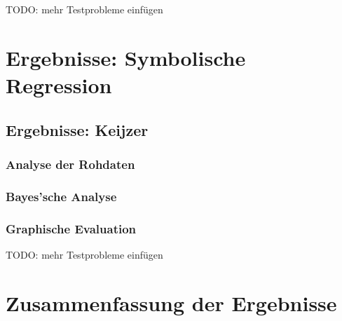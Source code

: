 TODO: mehr Testprobleme einfügen

\section{Ergebnisse: Symbolische Regression}
\label{sec:ergebnisseSR}

\subsection{Ergebnisse: Keijzer}
\label{subsec:ergebnisseKeijzer}
\subsubsection{Analyse der Rohdaten}
\label{keijzer:analyseRohdaten}
\subsubsection{Bayes'sche Analyse}
\label{keijzer:bayes}
\subsubsection{Graphische Evaluation}
\label{keijzer: graphische Evaluation}

TODO: mehr Testprobleme einfügen

\section{Zusammenfassung der Ergebnisse}
\label{sec:zusammenfassungErgebnisse}
